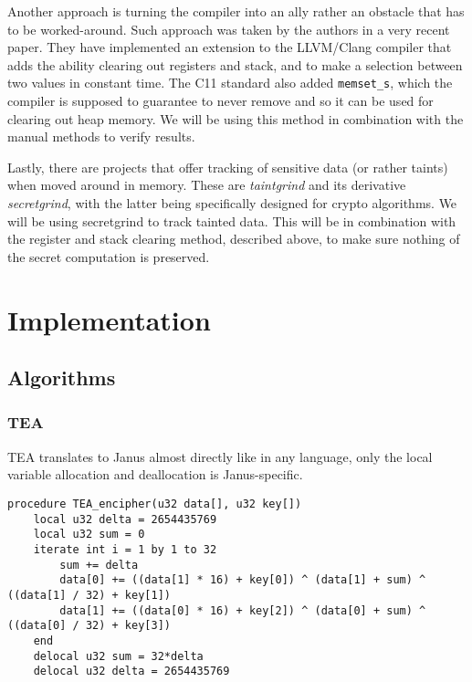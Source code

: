 \documentclass[a4paper,10pt,openright]{memoir}
\newcommand{\term}[1]{\textit{#1}}
\newcommand{\code}[1]{\texttt{#1}}
\begin{document}
Another approach is turning the compiler into an ally rather an 
obstacle that has to be worked-around. Such approach was taken by the 
authors in a very recent paper\cite{whatyouc}. They have implemented an 
extension to the LLVM/Clang compiler that adds the ability clearing out 
registers and stack, and to make a selection between two values in 
constant time. The C11 standard also added \code{memset\_s}, which the 
compiler is supposed to guarantee to never remove and so it can be used 
for clearing out heap memory. We will be using this method in 
combination with the manual methods to verify results.

Lastly, there are projects that offer tracking of sensitive data (or 
rather taints) when moved 
around in memory. These are \term{taintgrind} and its derivative 
\term{secretgrind}, with the latter being specifically designed for 
crypto algorithms. We will be using secretgrind to track tainted data. 
This will be in combination with the register and stack clearing 
method, described above, to make sure nothing of the secret computation 
is preserved.



\chapter{Implementation}

\section{Algorithms}

\subsection{TEA}
\label{sec:impl:tea}

TEA translates to Janus almost directly like in any language, only the 
local variable allocation and deallocation is Janus-specific.

\begin{lstlisting}[language=Janus]
procedure TEA_encipher(u32 data[], u32 key[])
    local u32 delta = 2654435769
    local u32 sum = 0
    iterate int i = 1 by 1 to 32
        sum += delta
        data[0] += ((data[1] * 16) + key[0]) ^ (data[1] + sum) ^ ((data[1] / 32) + key[1])
        data[1] += ((data[0] * 16) + key[2]) ^ (data[0] + sum) ^ ((data[0] / 32) + key[3])
    end
    delocal u32 sum = 32*delta
    delocal u32 delta = 2654435769
\end{lstlisting}
\end{document}
